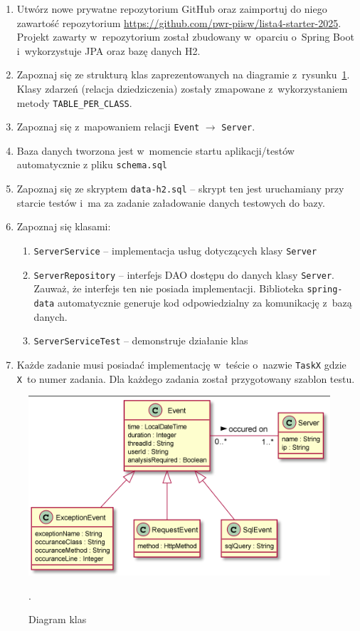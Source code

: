 \documentclass[12pt]{article}
\begin{document}
        \begin{enumerate}
            \item Utwórz nowe prywatne repozytorium GitHub oraz zaimportuj do niego zawartość repozytorium \url{https://github.com/pwr-piisw/lista4-starter-2025}. Projekt zawarty w~repozytorium został zbudowany w~oparciu o~Spring Boot i~wykorzystuje JPA oraz bazę danych H2.
            \item Zapoznaj się ze strukturą klas zaprezentowanych na diagramie z~rysunku~\ref{fig:class-diagram}. Klasy zdarzeń (relacja dziedziczenia) zostały zmapowane z~wykorzystaniem metody \texttt{TABLE\_PER\_CLASS}.
            \item Zapoznaj się z~mapowaniem relacji \texttt{Event} $\rightarrow$ \texttt{Server}.
            \item Baza danych tworzona jest w~momencie startu aplikacji/testów automatycznie z pliku \texttt{schema.sql}
            \item Zapoznaj się ze skryptem \texttt{data-h2.sql} -- skrypt ten jest uruchamiany przy starcie testów i~ma za zadanie załadowanie danych testowych do bazy.
            \item Zapoznaj się klasami:
                \begin{enumerate}
                    \item \texttt{ServerService} – implementacja usług dotyczących klasy \texttt{Server}
                    \item \texttt{ServerRepository} – interfejs DAO dostępu do danych klasy \texttt{Server}. Zauważ, że interfejs ten nie posiada implementacji. Biblioteka \texttt{spring-data} automatycznie generuje kod odpowiedzialny za komunikację z~bazą danych.
                    \item \texttt{ServerServiceTest} – demonstruje działanie klas
                \end{enumerate}
            \item Każde zadanie musi posiadać implementację w~teście o~nazwie \texttt{TaskX} gdzie \texttt{X}~to numer zadania. Dla każdego zadania został przygotowany szablon testu.
        \end{enumerate}
        \begin{figure}[ht]
            \centering
            \includegraphics{lista4_class_diagram_1.png}
            \caption{Diagram klas}.
            \label{fig:class-diagram}
        \end{figure}
\end{document}
